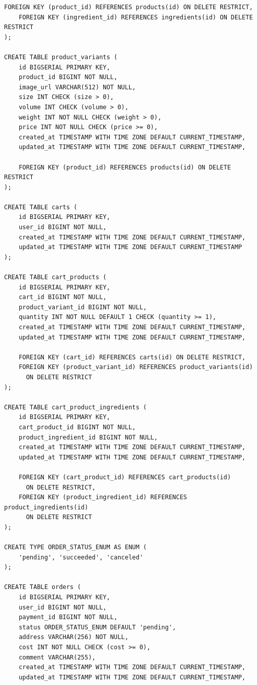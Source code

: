 \documentclass[a4paper,14pt]{extarticle}
\begin{document}
\begin{Verbatim}[tabsize=4,fontsize=\small]
    FOREIGN KEY (product_id) REFERENCES products(id) ON DELETE RESTRICT,
    FOREIGN KEY (ingredient_id) REFERENCES ingredients(id) ON DELETE RESTRICT
);

CREATE TABLE product_variants (
    id BIGSERIAL PRIMARY KEY,
    product_id BIGINT NOT NULL,
    image_url VARCHAR(512) NOT NULL,
    size INT CHECK (size > 0),
    volume INT CHECK (volume > 0),
    weight INT NOT NULL CHECK (weight > 0),
    price INT NOT NULL CHECK (price >= 0),
    created_at TIMESTAMP WITH TIME ZONE DEFAULT CURRENT_TIMESTAMP,
    updated_at TIMESTAMP WITH TIME ZONE DEFAULT CURRENT_TIMESTAMP,

    FOREIGN KEY (product_id) REFERENCES products(id) ON DELETE RESTRICT
);

CREATE TABLE carts (
    id BIGSERIAL PRIMARY KEY,
    user_id BIGINT NOT NULL,
    created_at TIMESTAMP WITH TIME ZONE DEFAULT CURRENT_TIMESTAMP,
    updated_at TIMESTAMP WITH TIME ZONE DEFAULT CURRENT_TIMESTAMP
);

CREATE TABLE cart_products (
    id BIGSERIAL PRIMARY KEY,
    cart_id BIGINT NOT NULL,
    product_variant_id BIGINT NOT NULL,
    quantity INT NOT NULL DEFAULT 1 CHECK (quantity >= 1),
    created_at TIMESTAMP WITH TIME ZONE DEFAULT CURRENT_TIMESTAMP,
    updated_at TIMESTAMP WITH TIME ZONE DEFAULT CURRENT_TIMESTAMP,

    FOREIGN KEY (cart_id) REFERENCES carts(id) ON DELETE RESTRICT,
    FOREIGN KEY (product_variant_id) REFERENCES product_variants(id)
      ON DELETE RESTRICT
);

CREATE TABLE cart_product_ingredients (
    id BIGSERIAL PRIMARY KEY,
    cart_product_id BIGINT NOT NULL,
    product_ingredient_id BIGINT NOT NULL,
    created_at TIMESTAMP WITH TIME ZONE DEFAULT CURRENT_TIMESTAMP,
    updated_at TIMESTAMP WITH TIME ZONE DEFAULT CURRENT_TIMESTAMP,

    FOREIGN KEY (cart_product_id) REFERENCES cart_products(id)
      ON DELETE RESTRICT,
    FOREIGN KEY (product_ingredient_id) REFERENCES product_ingredients(id)
      ON DELETE RESTRICT
);

CREATE TYPE ORDER_STATUS_ENUM AS ENUM (
    'pending', 'succeeded', 'canceled'
);

CREATE TABLE orders (
    id BIGSERIAL PRIMARY KEY,
    user_id BIGINT NOT NULL,
    payment_id BIGINT NOT NULL,
    status ORDER_STATUS_ENUM DEFAULT 'pending',
    address VARCHAR(256) NOT NULL,
    cost INT NOT NULL CHECK (cost >= 0),
    comment VARCHAR(255),
    created_at TIMESTAMP WITH TIME ZONE DEFAULT CURRENT_TIMESTAMP,
    updated_at TIMESTAMP WITH TIME ZONE DEFAULT CURRENT_TIMESTAMP,


\end{Verbatim}
\end{document}
